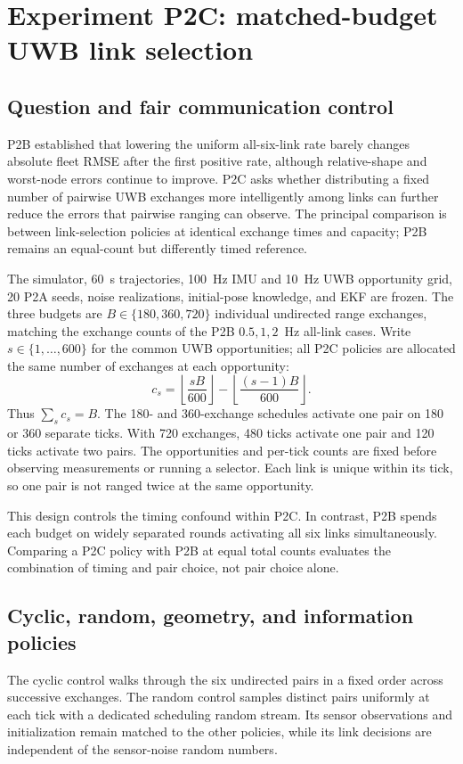 \section{Experiment P2C: matched-budget UWB link selection}
\subsection{Question and fair communication control}
P2B established that lowering the uniform all-six-link rate barely changes absolute fleet RMSE after the first positive rate, although relative-shape and worst-node errors continue to improve. P2C asks whether distributing a fixed number of pairwise UWB exchanges more intelligently among links can further reduce the errors that pairwise ranging can observe. The principal comparison is between link-selection policies at identical exchange times and capacity; P2B remains an equal-count but differently timed reference.

The simulator, \SI{60}{s} trajectories, \SI{100}{Hz} IMU and \SI{10}{Hz} UWB opportunity grid, 20 P2A seeds, noise realizations, initial-pose knowledge, and EKF are frozen. The three budgets are \(B\in\{180,360,720\}\) individual undirected range exchanges, matching the exchange counts of the P2B \(0.5,1,2\)~Hz all-link cases. Write \(s\in\{1,\ldots,600\}\) for the common UWB opportunities; all P2C policies are allocated the same number of exchanges at each opportunity:
\begin{equation}
    c_s=\left\lfloor\frac{sB}{600}\right\rfloor-
    \left\lfloor\frac{(s-1)B}{600}\right\rfloor.
    \label{eq:p2c_capacity}
\end{equation}
Thus \(\sum_s c_s=B\). The 180- and 360-exchange schedules activate one pair on 180 or 360 separate ticks. With 720 exchanges, 480 ticks activate one pair and 120 ticks activate two pairs. The opportunities and per-tick counts are fixed before observing measurements or running a selector. Each link is unique within its tick, so one pair is not ranged twice at the same opportunity.

This design controls the timing confound within P2C. In contrast, P2B spends each budget on widely separated rounds activating all six links simultaneously. Comparing a P2C policy with P2B at equal total counts evaluates the combination of timing and pair choice, not pair choice alone.

\subsection{Cyclic, random, geometry, and information policies}
The cyclic control walks through the six undirected pairs in a fixed order across successive exchanges. The random control samples distinct pairs uniformly at each tick with a dedicated scheduling random stream. Its sensor observations and initialization remain matched to the other policies, while its link decisions are independent of the sensor-noise random numbers.

